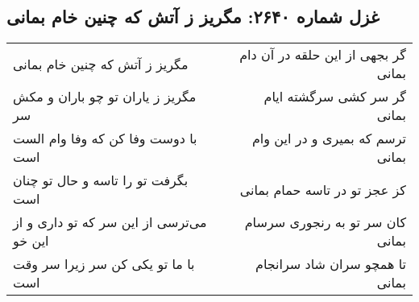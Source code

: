 \begin{center}
\section*{غزل شماره ۲۶۴۰: مگریز ز آتش که چنین خام بمانی}
\label{sec:2640}
\begin{longtable}{l p{0.5cm} r}
مگریز ز آتش که چنین خام بمانی
&&
گر بجهی از این حلقه در آن دام بمانی
\\
مگریز ز یاران تو چو باران و مکش سر
&&
گر سر کشی سرگشته ایام بمانی
\\
با دوست وفا کن که وفا وام الست است
&&
ترسم که بمیری و در این وام بمانی
\\
بگرفت تو را تاسه و حال تو چنان است
&&
کز عجز تو در تاسه حمام بمانی
\\
می‌ترسی از این سر که تو داری و از این خو
&&
کان سر تو به رنجوری سرسام بمانی
\\
با ما تو یکی کن سر زیرا سر وقت است
&&
تا همچو سران شاد سرانجام بمانی
\\
\end{longtable}
\end{center}
